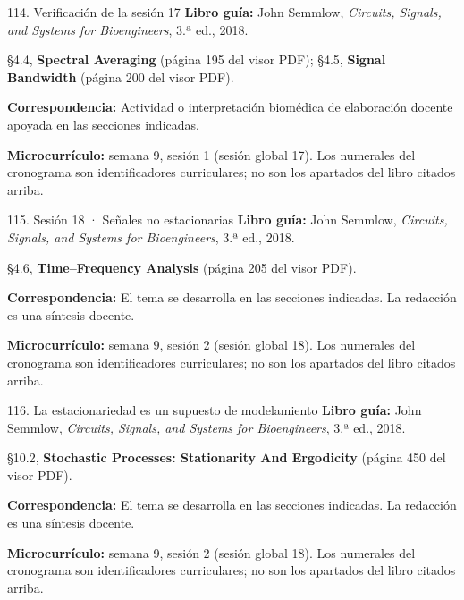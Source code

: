 \documentclass[
  10pt,
  ignorenonframetext,
  aspectratio=169,
  spanish,
]{beamer}
\begin{document}
\begin{frame}{114. Verificación de la sesión 17}
\label{verificaciuxf3n-de-la-sesiuxf3n-17}
\textbf{Libro guía:} John Semmlow, \emph{Circuits, Signals, and Systems
for Bioengineers}, 3.ª ed., 2018.

§4.4, \textbf{Spectral Averaging} (página 195 del visor PDF); §4.5,
\textbf{Signal Bandwidth} (página 200 del visor PDF).

\textbf{Correspondencia:} Actividad o interpretación biomédica de
elaboración docente apoyada en las secciones indicadas.

\textbf{Microcurrículo:} semana 9, sesión 1 (sesión global 17). Los
numerales del cronograma son identificadores curriculares; no son los
apartados del libro citados arriba.
\end{frame}

\begin{frame}{115. Sesión 18 · Señales no estacionarias}
\label{sesiuxf3n-18-seuxf1ales-no-estacionarias}
\textbf{Libro guía:} John Semmlow, \emph{Circuits, Signals, and Systems
for Bioengineers}, 3.ª ed., 2018.

§4.6, \textbf{Time--Frequency Analysis} (página 205 del visor PDF).

\textbf{Correspondencia:} El tema se desarrolla en las secciones
indicadas. La redacción es una síntesis docente.

\textbf{Microcurrículo:} semana 9, sesión 2 (sesión global 18). Los
numerales del cronograma son identificadores curriculares; no son los
apartados del libro citados arriba.
\end{frame}

\begin{frame}{116. La estacionariedad es un supuesto de modelamiento}
\label{la-estacionariedad-es-un-supuesto-de-modelamiento}
\textbf{Libro guía:} John Semmlow, \emph{Circuits, Signals, and Systems
for Bioengineers}, 3.ª ed., 2018.

§10.2, \textbf{Stochastic Processes: Stationarity And Ergodicity}
(página 450 del visor PDF).

\textbf{Correspondencia:} El tema se desarrolla en las secciones
indicadas. La redacción es una síntesis docente.

\textbf{Microcurrículo:} semana 9, sesión 2 (sesión global 18). Los
numerales del cronograma son identificadores curriculares; no son los
apartados del libro citados arriba.
\end{frame}
\end{document}
